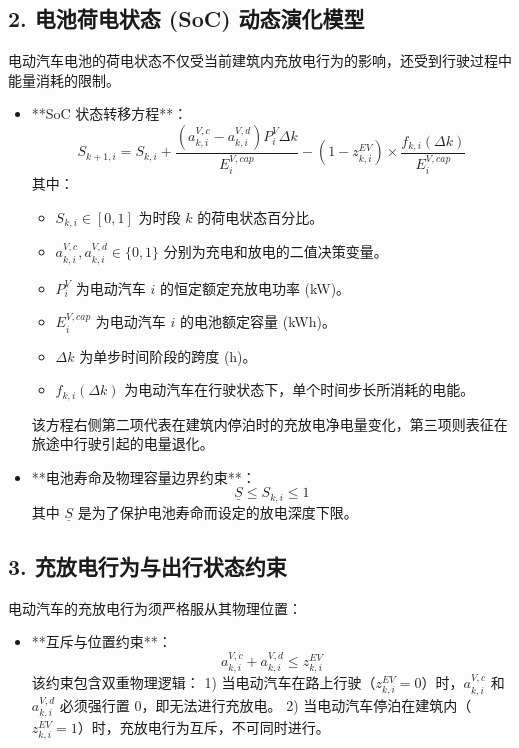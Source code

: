 \documentclass[11pt]{ctexart}
\begin{document}
\subsection*{2. 电池荷电状态 (SoC) 动态演化模型}
电动汽车电池的荷电状态不仅受当前建筑内充放电行为的影响，还受到行驶过程中能量消耗的限制。
\begin{itemize}
    \item **SoC 状态转移方程**：
    \begin{equation}
        S_{k+1,i} = S_{k,i} + \frac{(a_{k,i}^{V,c} - a_{k,i}^{V,d}) P_{i}^{V} \Delta k}{E_{i}^{V,cap}} - (1 - z_{k,i}^{EV}) \times \frac{f_{k,i}(\Delta k)}{E_{i}^{V,cap}}
    \end{equation}
    其中：
    \begin{itemize}
        \item $S_{k,i} \in [0,1]$ 为时段 $k$ 的荷电状态百分比。
        \item $a_{k,i}^{V,c}, a_{k,i}^{V,d} \in \{0,1\}$ 分别为充电和放电的二值决策变量。
        \item $P_{i}^{V}$ 为电动汽车 $i$ 的恒定额定充放电功率 (kW)。
        \item $E_{i}^{V,cap}$ 为电动汽车 $i$ 的电池额定容量 (kWh)。
        \item $\Delta k$ 为单步时间阶段的跨度 (h)。
        \item $f_{k,i}(\Delta k)$ 为电动汽车在行驶状态下，单个时间步长所消耗的电能。
    \end{itemize}
    该方程右侧第二项代表在建筑内停泊时的充放电净电量变化，第三项则表征在旅途中行驶引起的电量退化。

    \item **电池寿命及物理容量边界约束**：
    \begin{equation}
        \underline{S} \le S_{k,i} \le 1
    \end{equation}
    其中 $\underline{S}$ 是为了保护电池寿命而设定的放电深度下限。
\end{itemize}

\subsection*{3. 充放电行为与出行状态约束}
电动汽车的充放电行为须严格服从其物理位置：
\begin{itemize}
    \item **互斥与位置约束**：
    \begin{equation}
        a_{k,i}^{V,c} + a_{k,i}^{V,d} \le z_{k,i}^{EV}
    \end{equation}
    该约束包含双重物理逻辑：
    1) 当电动汽车在路上行驶（$z_{k,i}^{EV} = 0$）时，$a_{k,i}^{V,c}$ 和 $a_{k,i}^{V,d}$ 必须强行置 0，即无法进行充放电。
    2) 当电动汽车停泊在建筑内（$z_{k,i}^{EV} = 1$）时，充放电行为互斥，不可同时进行。
\end{itemize}
\end{document}
